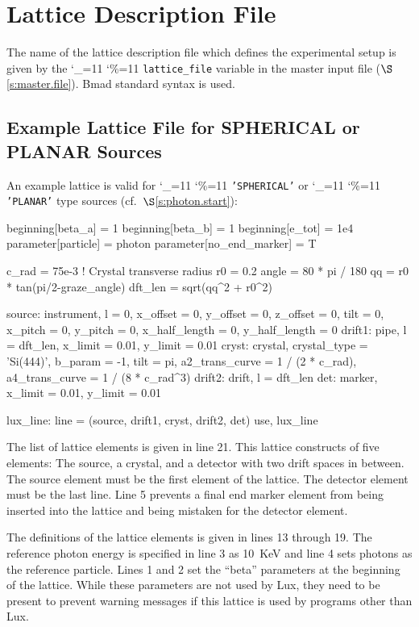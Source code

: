 \documentclass[11pt]{article}
\newcommand{\lux}{Lux\xspace}
\newcommand\ttcmd{\begingroup\catcode`\_=11 \catcode`\%=11 \dottcmd}
\newcommand\dottcmd[1]{\texttt{#1}\endgroup}
\newcommand{\vn}{\ttcmd}
\newcommand{\sref}[1]{$\S$\ref{#1}}
\begin{document}
\section{Lattice Description File}
\label{s:lat.file}

The name of the lattice description file which defines the
experimental setup is given by the \vn{lattice_file} variable in the
master input file (\sref{s:master.file}). Bmad standard syntax is
used\cite{b:bmad}. 

\subsection{Example Lattice File for SPHERICAL or PLANAR Sources}
\label{s:spherical.lat}

An example lattice is valid for \vn{'SPHERICAL'} or
\vn{'PLANAR'} type sources (cf.~\sref{s:photon.start}):
\begin{listing}{1}
beginning[beta_a] = 1
beginning[beta_b] = 1
beginning[e_tot] = 1e4
parameter[particle] = photon
parameter[no_end_marker] = T

c_rad = 75e-3  ! Crystal transverse radius 
r0 = 0.2
angle  = 80 * pi / 180
qq = r0 * tan(pi/2-graze_angle)
dft_len = sqrt(qq^2 + r0^2)

source: instrument, l = 0, x_offset = 0, y_offset = 0, z_offset = 0, tilt = 0,
        x_pitch = 0, y_pitch = 0, x_half_length = 0, y_half_length = 0
drift1: pipe, l = dft_len, x_limit = 0.01, y_limit = 0.01
cryst: crystal, crystal_type = 'Si(444)', b_param = -1, tilt = pi, 
        a2_trans_curve = 1 / (2 * c_rad), a4_trans_curve = 1 / (8 * c_rad^3)
drift2: drift, l = dft_len
det: marker, x_limit = 0.01, y_limit = 0.01

lux_line: line = (source, drift1, cryst, drift2, det)
use, lux_line
\end{listing}

The list of lattice elements is given in line 21.  This lattice
constructs of five elements: The source, a crystal, and a detector
with two drift spaces in between. The source element must be the first
element of the lattice. The detector element must be the last
line. Line 5 prevents a final end marker element from being inserted
into the lattice and being mistaken for the detector element.

The definitions of the lattice elements is given in lines 13 through
19.  The reference photon energy is specified in line 3 as 10~KeV and
line 4 sets photons as the reference particle. Lines 1 and 2 set the
``beta'' parameters at the beginning of the lattice. While these
parameters are not used by \lux, they need to be present to prevent
warning messages if this lattice is used by programs other than \lux.
\end{document}
